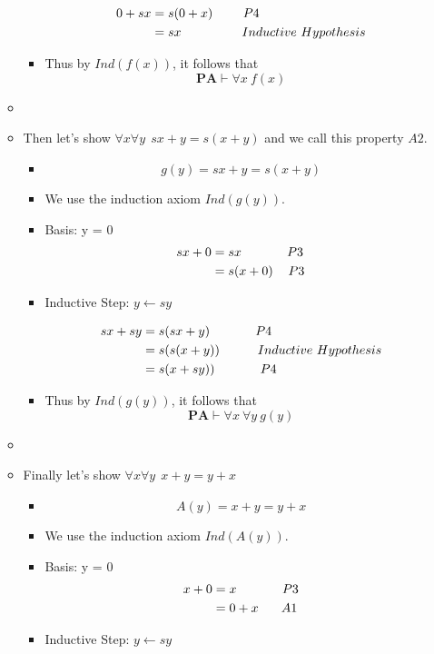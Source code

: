 \documentclass[11pt,twoside]{article}
\begin{document}
\begin{enumerate}[leftmargin=0pt]
\begin{itemize}[label ={}]
\begin{itemize}[label ={}]
					\begin{align} \nonumber
                                        			0+sx &= s(0+x)  \hskip2pc  P4\\ \nonumber
                                        			& = sx \hskip4pc  Inductive \ Hypothesis \nonumber
                        			\end{align}
			\item Thus by $Ind(f(x))$, it follows that 
					\[ \textbf{PA}  \vdash \forall x\  f(x) \]
			\end{itemize}
	\item
	\item  Then let's show $\forall x \forall y \ \ sx+y = s(x+y)$ and we call this property $A2$.
			\begin{itemize}[label ={}]
			\item \[ g(y) = sx+y = s(x+y)\]
			\item We use the induction axiom $Ind(g(y))$.
			\item Basis: y = 0
					\begin{align} \nonumber
                                        			sx+ 0 &= sx \hskip3pc  P3\\ \nonumber
                                        				 & = s(x+0)	    \hskip1pc  P3 \nonumber
                        			\end{align}
			\item Inductive Step: $y \leftarrow sy$
	
					\begin{align} \nonumber
                                        			sx+sy &= s(sx+y)  \hskip3pc  P4\\ \nonumber
								&= s(s(x+y))	\hskip2.5pc   Inductive \ Hypothesis \\ \nonumber
                                        				& = s(x+sy)) 	\hskip3pc  P4 \nonumber
                        			\end{align}
			\item Thus by $Ind(g(y))$, it follows that 
					\[ \textbf{PA}  \vdash \forall x \ \forall y \  g(y) \]
			\end{itemize}
	\item
	\item  Finally let's show $\forall x \forall y \ \ x+y = y+x$
			\begin{itemize}[label ={}]
			\item \[ A(y) =  x+y = y+x\]
			\item We use the induction axiom $Ind(A(y))$.
			\item Basis: y = 0
					\begin{align} \nonumber
                                        			x+ 0 &= x \hskip3pc  P3\\ \nonumber
                                        				 & = 0+x	    \hskip1.5pc  A1 \nonumber
                        			\end{align}
			\item Inductive Step: $y \leftarrow sy$
	

\end{itemize}
\end{itemize}
\end{enumerate}
\end{document}
